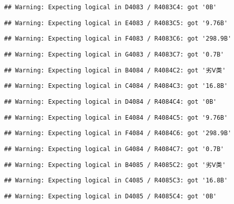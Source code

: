 \documentclass[
]{article}
\begin{document}
\begin{verbatim}
## Warning: Expecting logical in D4083 / R4083C4: got '0B'
\end{verbatim}

\begin{verbatim}
## Warning: Expecting logical in E4083 / R4083C5: got '9.76B'
\end{verbatim}

\begin{verbatim}
## Warning: Expecting logical in F4083 / R4083C6: got '298.9B'
\end{verbatim}

\begin{verbatim}
## Warning: Expecting logical in G4083 / R4083C7: got '0.7B'
\end{verbatim}

\begin{verbatim}
## Warning: Expecting logical in B4084 / R4084C2: got '劣Ⅴ类'
\end{verbatim}

\begin{verbatim}
## Warning: Expecting logical in C4084 / R4084C3: got '16.8B'
\end{verbatim}

\begin{verbatim}
## Warning: Expecting logical in D4084 / R4084C4: got '0B'
\end{verbatim}

\begin{verbatim}
## Warning: Expecting logical in E4084 / R4084C5: got '9.76B'
\end{verbatim}

\begin{verbatim}
## Warning: Expecting logical in F4084 / R4084C6: got '298.9B'
\end{verbatim}

\begin{verbatim}
## Warning: Expecting logical in G4084 / R4084C7: got '0.7B'
\end{verbatim}

\begin{verbatim}
## Warning: Expecting logical in B4085 / R4085C2: got '劣Ⅴ类'
\end{verbatim}

\begin{verbatim}
## Warning: Expecting logical in C4085 / R4085C3: got '16.8B'
\end{verbatim}

\begin{verbatim}
## Warning: Expecting logical in D4085 / R4085C4: got '0B'
\end{verbatim}
\end{document}
